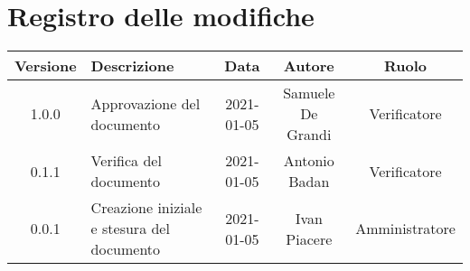 \section*{Registro delle modifiche}

\begin{center}
	\begin{longtable}{|c|p{5cm}|c|c|c|}
	\hline
	\rowcolor{lighter-grayer}
	\textbf{Versione} & \textbf{Descrizione} & \textbf{Data} & \textbf{Autore} & \textbf{Ruolo} \\
	\hline
	\endfirsthead


	1.0.0 & Approvazione del documento & 2021-01-05 & Samuele De Grandi & Verificatore \\
	\hline
	0.1.1 & Verifica del documento & 2021-01-05 & Antonio Badan & Verificatore \\
	\hline
	0.0.1 & Creazione iniziale e stesura del documento & 2021-01-05 & Ivan Piacere & Amministratore \\
	\hline
	\end{longtable}
\end{center}